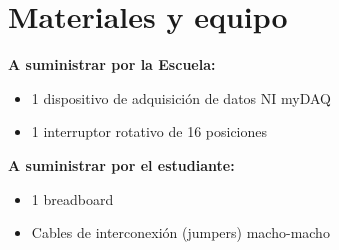 \documentclass[12pt,letterpaper]{report}
\newcommand{\mat}{Materiales y equipo}
\begin{document}
\section{\mat}
\textbf{A suministrar por la Escuela:}
\begin{itemize}
\item 1 dispositivo de adquisición de datos NI myDAQ
\item 1 interruptor rotativo de 16 posiciones 

\end{itemize}
\textbf{A suministrar por el estudiante:}
\begin{itemize}
\item 1 breadboard
\item Cables de interconexión (jumpers) macho-macho
\end{itemize}
\end{document}
